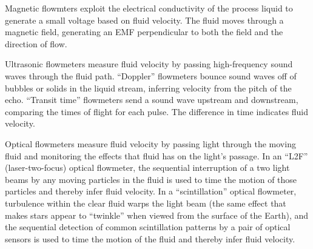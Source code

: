 \vskip 10pt

Magnetic flowmters exploit the electrical conductivity of the process liquid to generate a small voltage based on fluid velocity.  The fluid moves through a magnetic field, generating an EMF perpendicular to both the field and the direction of flow.

\vskip 10pt

Ultrasonic flowmeters measure fluid velocity by passing high-frequency sound waves through the fluid path.  ``Doppler'' flowmeters bounce sound waves off of bubbles or solids in the liquid stream, inferring velocity from the pitch of the echo.  ``Transit time'' flowmeters send a sound wave upstream and downstream, comparing the times of flight for each pulse.  The difference in time indicates fluid velocity.

\vskip 10pt

Optical flowmeters measure fluid velocity by passing light through the moving fluid and monitoring the effects that fluid has on the light's passage.  In an ``L2F'' (laser-two-focus) optical flowmeter, the sequential interruption of a two light beams by any moving particles in the fluid is used to time the motion of those particles and thereby infer fluid velocity.  In a ``scintillation'' optical flowmeter, turbulence within the clear fluid warps the light beam (the same effect that makes stars appear to ``twinkle'' when viewed from the surface of the Earth), and the sequential detection of common scintillation patterns by a pair of optical sensors is used to time the motion of the fluid and thereby infer fluid velocity.







